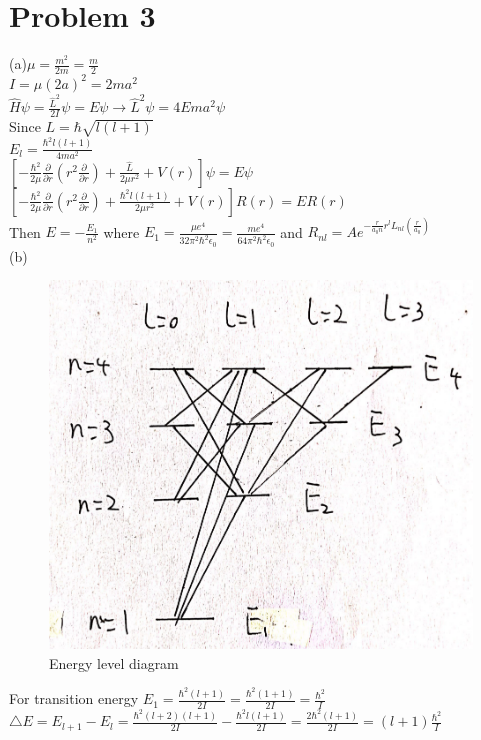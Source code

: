 \documentclass[a4paper]{article}
\begin{document}
\section{Problem 3}
    \noindent(a)$\mu=\frac{m^2}{2m}=\frac{m}{2}$
    \\$I=\mu(2a)^2=2ma^2$
    \\$\hat{H}\psi=\frac{\hat{L}^2}{2I}\psi=E\psi\rightarrow\hat{L}^2\psi=4Ema^2\psi$
    \\Since $L=\hbar\sqrt{l(l+1)}$
    \\$E_l=\frac{\hbar^2l(l+1)}{4ma^2}$
    \\$[-\frac{\hbar^2}{2\mu}\frac{\partial}{\partial r}(r^2\frac{\partial}{\partial r})+\frac{\hat{L}}{2\mu r^2}+V(r)]\psi=E\psi$
    \\$[-\frac{\hbar^2}{2\mu}\frac{\partial}{\partial r}(r^2\frac{\partial}{\partial r})+\frac{\hbar^2l(l+1)}{2\mu r^2}+V(r)]R(r)=ER(r)$
    \\Then $E=-\frac{E_1}{n^2}$ where $E_1=\frac{\mu e^4}{32\pi^2\hbar^2\epsilon_0}=\frac{me^4}{64\pi^2\hbar^2\epsilon_0}$ and $R_{nl}=Ae^{-\frac{r}{a_0n}r^lL_{nl}(\frac{r}{a_0})}$
    \\(b)\begin{figure}[H]
        \centering
        \includegraphics[scale=0.25]{P2.png}
        \caption{Energy level diagram}
    \end{figure}
    \noindent For transition energy $E_1=\frac{\hbar^2(l+1)}{2I}=\frac{\hbar^2(1+1)}{2I}=\frac{\hbar^2}{I}$
    \\$\bigtriangleup E=E_{l+1}-E_l=\frac{\hbar^2(l+2)(l+1)}{2I}-\frac{\hbar^2l(l+1)}{2I}=\frac{2\hbar^2(l+1)}{2I}=(l+1)\frac{\hbar^2}{I}$
\end{document}
